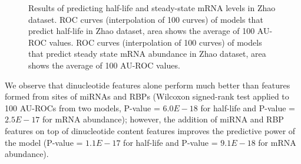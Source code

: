 \begin{figure}[H]
	\centering
\quad

\caption[Predicting stability and gene expression with a logistic regression model]{Results of predicting half-life and steady-state mRNA levels in Zhao dataset.   ROC curves (interpolation of 100 curves) of models that predict half-life in Zhao dataset, area shows the average of 100 AU-ROC values.  ROC curves (interpolation of 100 curves) of models that predict steady state mRNA abundance in Zhao dataset, area shows the average of 100 AU-ROC values. }
\label{zhao_nostr_nogparclip}
\end{figure}

We observe that dinucleotide features alone perform much better than features formed from sites of miRNAs and RBPs (Wilcoxon signed-rank test applied to 100 AU-ROCs from two models, P-value = $6.0E-18$ for half-life and P-value = $2.5E-17$ for mRNA abundance); however, the addition of miRNA and RBP features on top of dinucleotide content features improves the predictive power of the model (P-value = $1.1E-17$ for half-life and P-value = $9.1E-18$ for mRNA abundance). %

